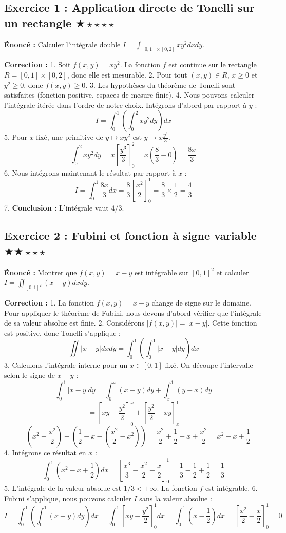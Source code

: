 \documentclass[11pt,a4paper]{article}
\begin{document}
\subsection*{Exercice 1 : Application directe de Tonelli sur un rectangle \quad $\bigstar\star\star\star\star$}

\textbf{Énoncé :}
Calculer l'intégrale double $I = \int_{[0, 1] \times [0, 2]} x y^2 dx dy$.

\textbf{Correction :}
1. Soit $f(x, y) = x y^2$. La fonction $f$ est continue sur le rectangle $R = [0, 1] \times [0, 2]$, donc elle est mesurable.
2. Pour tout $(x, y) \in R$, $x \ge 0$ et $y^2 \ge 0$, donc $f(x, y) \ge 0$.
3. Les hypothèses du théorème de Tonelli sont satisfaites (fonction positive, espaces de mesure finie).
4. Nous pouvons calculer l'intégrale itérée dans l'ordre de notre choix. Intégrons d'abord par rapport \`a $y$ :
   $$ I = \int_0^1 \left( \int_0^2 x y^2 dy \right) dx $$
5. Pour $x$ fixé, une primitive de $y \mapsto x y^2$ est $y \mapsto x \frac{y^3}{3}$.
   $$ \int_0^2 x y^2 dy = x \left[ \frac{y^3}{3} \right]_0^2 = x \left( \frac{8}{3} - 0 \right) = \frac{8x}{3} $$
6. Nous intégrons maintenant le résultat par rapport \`a $x$ :
   $$ I = \int_0^1 \frac{8x}{3} dx = \frac{8}{3} \left[ \frac{x^2}{2} \right]_0^1 = \frac{8}{3} \times \frac{1}{2} = \frac{4}{3} $$
7. \textbf{Conclusion :} L'intégrale vaut $4/3$.


\subsection*{Exercice 2 : Fubini et fonction \`a signe variable \quad $\bigstar\bigstar\star\star\star$}

\textbf{Énoncé :}
Montrer que $f(x, y) = x - y$ est intégrable sur $[0, 1]^2$ et calculer $I = \iint_{[0, 1]^2} (x - y) dx dy$.

\textbf{Correction :}
1. La fonction $f(x, y) = x - y$ change de signe sur le domaine. Pour appliquer le théorème de Fubini, nous devons d'abord vérifier que l'intégrale de sa valeur absolue est finie.
2. Considérons $|f(x, y)| = |x - y|$. Cette fonction est positive, donc Tonelli s'applique :
   $$ \iint |x - y| dx dy = \int_0^1 \left( \int_0^1 |x - y| dy \right) dx $$
3. Calculons l'intégrale interne pour un $x \in [0, 1]$ fixé. On découpe l'intervalle selon le signe de $x - y$ :
   $$ \int_0^1 |x - y| dy = \int_0^x (x - y) dy + \int_x^1 (y - x) dy $$
   $$ = \left[ xy - \frac{y^2}{2} \right]_0^x + \left[ \frac{y^2}{2} - xy \right]_x^1 $$
   $$ = \left( x^2 - \frac{x^2}{2} \right) + \left( \frac{1}{2} - x - (\frac{x^2}{2} - x^2) \right) = \frac{x^2}{2} + \frac{1}{2} - x + \frac{x^2}{2} = x^2 - x + \frac{1}{2} $$
4. Intégrons ce résultat en $x$ :
   $$ \int_0^1 \left( x^2 - x + \frac{1}{2} \right) dx = \left[ \frac{x^3}{3} - \frac{x^2}{2} + \frac{x}{2} \right]_0^1 = \frac{1}{3} - \frac{1}{2} + \frac{1}{2} = \frac{1}{3} $$
5. L'intégrale de la valeur absolue est $1/3 < +\infty$. La fonction $f$ est intégrable.
6. Fubini s'applique, nous pouvons calculer $I$ sans la valeur absolue :
   $$ I = \int_0^1 \left( \int_0^1 (x - y) dy \right) dx = \int_0^1 \left[ xy - \frac{y^2}{2} \right]_0^1 dx = \int_0^1 (x - \frac{1}{2}) dx = \left[ \frac{x^2}{2} - \frac{x}{2} \right]_0^1 = 0 $$
\end{document}
